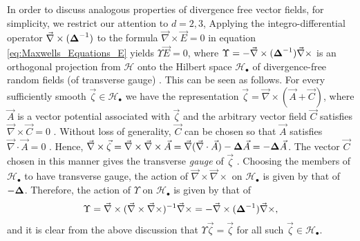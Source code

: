 \documentclass{cmslatex}
\newcommand\bDelta{\mbox{\boldmath${\Delta}$}}
\begin{document}
In order to discuss analogous properties of divergence free vector
fields, for simplicity, we restrict our attention to $d=2,3$,
Applying the integro-differential
operator $\vec{\nabla}\times(\bDelta^{-1})$ to the formula
$\vec{\nabla}\times\vec{E}=0$ in equation \eqref{eq:Maxwells_Equations_E} yields  
$\Upsilon\vec{E}=0$, where $\Upsilon=-\vec{\nabla}\times(\bDelta^{-1})\vec{\nabla}\times$ is an
orthogonal projection from $\mathscr{H}$ onto the Hilbert space 
$\mathscr{H}_{\bullet}$ of divergence-free random fields (of transverse
gauge) \cite{Murphy:JMP:063506}. This can be seen as  
follows. For every sufficiently smooth $\vec{\zeta}\in\mathscr{H}_\bullet$ we have
the representation
$\vec{\zeta}=\vec{\nabla}\times(\vec{A}+\vec{C})$, where $\vec{A}$ is a vector
potential associated with $\vec{\zeta}$ and the arbitrary vector field
$\vec{C}$ satisfies $\vec{\nabla}\times\vec{C}=0$ \cite{Jackson-1999}. Without
loss of generality, $\vec{C}$ can be chosen so that $\vec{A}$
satisfies $\vec{\nabla}\cdot\vec{A}=0$ \cite{Jackson-1999}. Hence,
$\vec{\nabla}\times\vec{\zeta}=\vec{\nabla}\times\vec{\nabla}\times\vec{A}
=\vec{\nabla}(\vec{\nabla}\cdot\vec{A})-\bDelta\vec{A}=-\bDelta\vec{A}$. The vector 
$\vec{C}$ chosen in this manner gives the transverse \emph{gauge} of
$\vec{\zeta}$ \cite{Jackson-1999}. Choosing the members of 
$\mathscr{H}_\bullet$ to have transverse gauge, the action of
$\vec{\nabla}\times\vec{\nabla}\times$ on $\mathscr{H}_\bullet$ is given by that of
$-\bDelta$. Therefore, the action of $\Upsilon$ on $\mathscr{H}_\bullet$ is given
by that of 
%
\begin{align}\label{eq:GammaCurl}
  \Upsilon=\vec{\nabla}\times(\vec{\nabla}\times\vec{\nabla}\times)^{-1}\vec{\nabla}\times
  =-\vec{\nabla}\times(\bDelta^{-1})\vec{\nabla}\times, 
\end{align}
%
and it is clear from the above discussion that $\Upsilon\vec{\zeta}=\vec{\zeta}$ for
all such $\vec{\zeta}\in\mathscr{H}_\bullet$.
\end{document}
